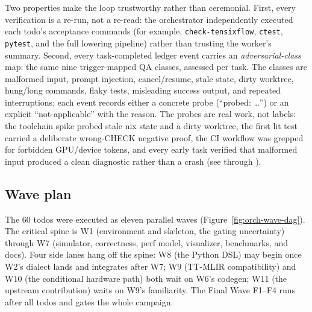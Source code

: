 Two properties make the loop trustworthy rather than ceremonial. First, every
verification is a re-run, not a re-read: the orchestrator independently
executed each todo's acceptance commands (for example, \texttt{check-tensixflow},
\texttt{ctest}, \texttt{pytest}, and the full lowering pipeline) rather than
trusting the worker's summary. Second, every task-completed ledger event
carries an \emph{adversarial-class} map: the same nine trigger-mapped QA
classes, assessed per task. The classes are malformed input, prompt injection,
cancel/resume, stale state, dirty worktree, hung/long commands, flaky tests,
misleading success output, and repeated interruptions; each event records
either a concrete probe (``probed: \ldots'') or an explicit
``not-applicable'' with the reason. The probes are real work, not labels: the
toolchain spike probed stale nix state and a dirty worktree, the first lit test
carried a deliberate wrong-CHECK negative proof, the CI workflow was grepped
for forbidden GPU/device tokens, and every early task verified that malformed
input produced a clean diagnostic rather than a crash (see
 through
).

\subsection{Wave plan}

The 60 todos were executed as eleven parallel waves
(Figure~\ref{fig:orch-wave-dag}). The critical spine is W1 (environment and
skeleton, the gating uncertainty) through W7 (simulator, correctness, perf
model, visualizer, benchmarks, and docs). Four side lanes hang off the spine:
W8 (the Python DSL) may begin once W2's dialect lands and integrates after W7;
W9 (TT-MLIR compatibility) and W10 (the conditional hardware path) both wait on
W6's codegen; W11 (the upstream contribution) waits on W9's familiarity. The
Final Wave F1--F4 runs after all todos and gates the whole campaign.

